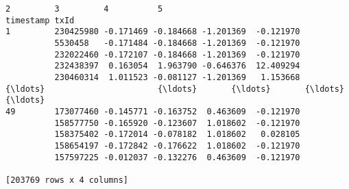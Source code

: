 \documentclass[11pt]{article}
\begin{document}
    
    \begin{Verbatim}[commandchars=\\\{\}]
                            2         3         4          5
timestamp txId                                              
1         230425980 -0.171469 -0.184668 -1.201369  -0.121970
          5530458   -0.171484 -0.184668 -1.201369  -0.121970
          232022460 -0.172107 -0.184668 -1.201369  -0.121970
          232438397  0.163054  1.963790 -0.646376  12.409294
          230460314  1.011523 -0.081127 -1.201369   1.153668
{\ldots}                       {\ldots}       {\ldots}       {\ldots}        {\ldots}
49        173077460 -0.145771 -0.163752  0.463609  -0.121970
          158577750 -0.165920 -0.123607  1.018602  -0.121970
          158375402 -0.172014 -0.078182  1.018602   0.028105
          158654197 -0.172842 -0.176622  1.018602  -0.121970
          157597225 -0.012037 -0.132276  0.463609  -0.121970

[203769 rows x 4 columns]
    \end{Verbatim}
\end{document}
